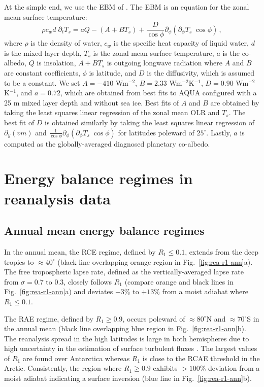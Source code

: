 \documentclass{ametsocV5}
\begin{document}
    At the simple end, we use the EBM of \cite{rose2017}. The EBM is an equation for the zonal mean surface temperature:
    \begin{equation}
      \rho c_w d \; \partial_t T_s = aQ - (A+BT_s)  + \frac{D}{\cos\phi}\partial_\phi\left( \partial_\phi T_s \; \cos\phi \right)\, ,
    \end{equation}
    where $\rho$ is the density of water, $c_w$ is the specific heat capacity of liquid water, $d$ is the mixed layer depth, $T_s$ is the zonal mean surface temperature, $a$ is the co-albedo, $Q$ is insolation, $A+BT_s$ is outgoing longwave radiation where $A$ and $B$ are constant coefficients, $\phi$ is latitude, and $D$ is the diffusivity, which is assumed to be a constant. We set $A=-410$ Wm$^{-2}$, $B=2.33$ Wm$^{-2}$K$^{-1}$, $D=0.90$ Wm$^{-2}$K$^{-1}$, and $a=0.72$, which are obtained from best fits to AQUA configured with a 25 m mixed layer depth and without sea ice. Best fits of $A$ and $B$ are obtained by taking the least squares linear regression of the zonal mean $\mathrm{OLR}$ and $T_s$. The best fit of $D$ is obtained similarly by taking the least squares linear regression of $\partial_y (vm)$ and $\frac{1}{\cos\phi}\partial_\phi \left(\partial_\phi T_s \; \cos\phi \right)$ for latitudes poleward of $25^\circ$. Lastly, $a$ is computed as the globally-averaged diagnosed planetary co-albedo.

\section{Energy balance regimes in reanalysis data} \label{sec:diagnostics}
    \subsection{Annual mean energy balance regimes}
    In the annual mean, the RCE regime, defined by $R_1 \le 0.1$, extends from the deep tropics to $\approx 40^\circ$ (black line overlapping orange region in Fig.~\ref{fig:rea-r1-ann}a). The free tropospheric lapse rate, defined as the vertically-averaged lapse rate from $\sigma=0.7$ to 0.3, closely follows $R_1$ (compare orange and black lines in Fig.~\ref{fig:rea-r1-ann}a) and deviates $-3$\% to $+13$\% from a moist adiabat where $R_1 \le 0.1$.

    The RAE regime, defined by $R_1 \ge 0.9$, occurs poleward of $\approx 80^\circ$N and $\approx 70^\circ$S in the annual mean (black line overlapping blue region in Fig.~\ref{fig:rea-r1-ann}b). The reanalysis spread in the high latitudes is large in both hemispheres due to high uncertainty in the estimation of surface turbulent fluxes \citep{tastula2013,graham2019}. The largest values of $R_1$ are found over Antarctica whereas $R_1$ is close to the RCAE threshold in the Arctic. Consistently, the region where $R_1\ge 0.9$ exhibits $>100\%$ deviation from a moist adiabat indicating a surface inversion (blue line in Fig.~\ref{fig:rea-r1-ann}b).
\end{document}
